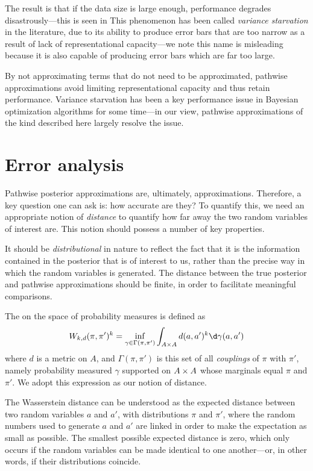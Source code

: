 \documentclass[11pt]{book}
\begin{document}
The result is that if the data size is large enough, performance degrades disastrously---this is seen in 
This phenomenon has been called \emph{variance starvation} in the literature, due to its ability to produce error bars that are too narrow as a result of lack of representational capacity---we note this name is misleading because it is also capable of producing error bars which are far too large.

By not approximating terms that do not need to be approximated, pathwise approximations avoid limiting representational capacity and thus retain performance.
Variance starvation has been a key performance issue in Bayesian optimization algorithms for some time---in our view, pathwise approximations of the kind described here largely resolve the issue.


\section{Error analysis}

Pathwise posterior approximations are, ultimately, approximations.
Therefore, a key question one can ask is: how accurate are they?
To quantify this, we need an appropriate notion of \emph{distance} to quantify how far away the two random variables of interest are.
This notion should possess a number of key properties.

\1  It should be \emph{distributional} in nature to reflect the fact that it is the information contained in the posterior that is of interest to us, rather than the precise way in which the random variables is generated.
\2 The distance between the true posterior and pathwise approximations should be finite, in order to facilitate meaningful comparisons.
\0 

The  on the space of probability measures is defined as 
\[
W_{k,d}(\pi,\pi')^k = \inf_{\gamma\in\Gamma(\pi,\pi')} \int_{A\x A} d(a,a')^k \d\gamma(a,a')
\]
where $d$ is a metric on $A$, and $\Gamma(\pi,\pi')$ is this set of all \emph{couplings} of $\pi$ with $\pi'$, namely probability measured $\gamma$ supported on $A\times A$ whose marginals equal $\pi$ and $\pi'$.
We adopt this expression as our notion of distance.

The Wasserstein distance can be understood as the expected distance between two random variables $a$ and $a'$, with distributions $\pi$ and $\pi'$, where the random numbers used to generate $a$ and $a'$ are linked in order to make the expectation as small as possible.
The smallest possible expected distance is zero, which only occurs if the random variables can be made identical to one another---or, in other words, if their distributions coincide.
\end{document}
